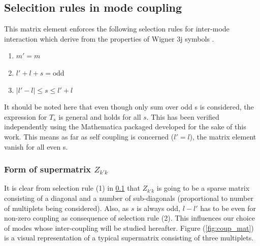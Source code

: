 \subsection{Selecition rules in mode coupling}\label{sec:selec_rules}
This matrix element enforces the following selection rules for inter-mode interaction which derive from the properties of Wigner 3j symbols \cite{lavely92}.
\begin{enumerate}
\item $m'=m$
\item $l'+l+s = \text{odd}$
\item $|l'-l| \leq s \leq l'+l$
\end{enumerate}
It should be noted here that even though only sum over odd s is considered, the expression for $T_s$ is general and holds for all $s$. This has been verified independently using the Mathematica packaged developed for the sake of this work. This means as far as self coupling is concerned ($l'=l$), the matrix element vanish for all even s.

\subsubsection{Form of supermatrix $Z_{k'k}$}

It is clear from selection rule (1) in \ref{sec:selec_rules} that $Z_{k'k}$ is going to be a sparse matrix consisting of a diagonal and a number of sub-diagonals (proportional to number of multiplets being considered). Also, as $s$ is always odd, $l-l'$ has to be even for non-zero coupling as consequence of selection rule (2). This influences our choice of modes whose inter-coupling will be studied hereafter. Figure (\ref{fig:coup_mat}) is a visual representation of a typical supermatrix consisting of three multiplets.

